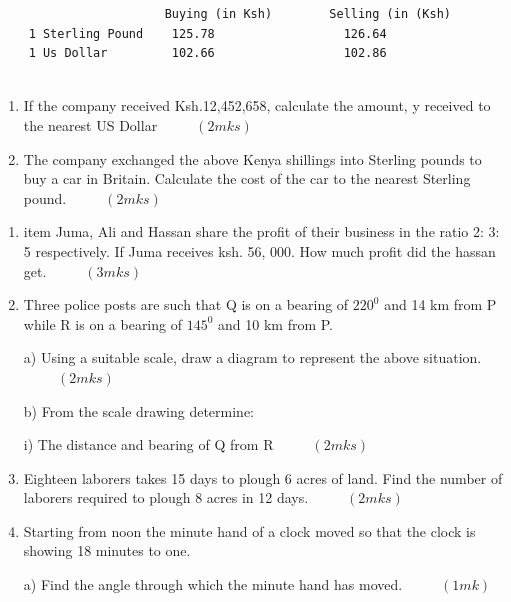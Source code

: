 \documentclass[
  a4paperpaper,
]{scrbook}
\begin{document}
\begin{tcolorbox}
\begin{verbatim}
                       Buying (in Ksh)        Selling (in (Ksh)
    1 Sterling Pound    125.78                  126.64 
    1 Us Dollar         102.66                  102.86
  
\end{verbatim}

\begin{enumerate}
\def\labelenumi{\alph{enumi})}
\item
  If the company received Ksh.12,452,658, calculate the amount, y
  received to the nearest US Dollar \(\hspace{1cm} (2mks)\)
\item
  The company exchanged the above Kenya shillings into Sterling pounds
  to buy a car in Britain. Calculate the cost of the car to the nearest
  Sterling pound. \(\hspace{1cm} (2mks)\)
\end{enumerate}

\begin{enumerate}
\def\labelenumi{\arabic{enumi}.}
\setcounter{enumi}{10}
\item
  item Juma, Ali and Hassan share the profit of their business in the
  ratio 2: 3: 5 respectively. If Juma receives ksh. 56, 000. How much
  profit did the hassan get. \(\hspace{1cm}(3mks)\)
\item
  Three police posts are such that Q is on a bearing of \(220^0\) and 14
  km from P while R is on a bearing of \(145^0\) and 10 km from P.

  a) Using a suitable scale, draw a diagram to represent the above
  situation. \(\hspace{1cm}(2mks)\)

  b) From the scale drawing determine:

  i) The distance and bearing of Q from R \(\hspace{1cm} (2mks)\)
\item
  Eighteen laborers takes 15 days to plough 6 acres of land. Find the
  number of laborers required to plough 8 acres in 12 days.
  \(\hspace{1cm} (2mks)\)
\item
  Starting from noon the minute hand of a clock moved so that the clock
  is showing 18 minutes to one.

  a) Find the angle through which the minute hand has moved.
  \(\hspace{1cm} (1mk)\)


\end{enumerate}
\end{tcolorbox}
\end{document}

